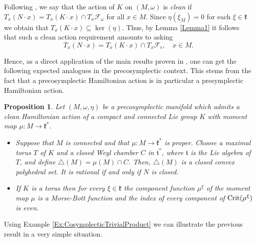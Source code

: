 \documentclass[
  a4paper, 
  reqno, 
  oneside, 
  12pt
]{amsart}
\newtheorem{proposition}[theorem]{Proposition}
\theoremstyle{definition}
\theoremstyle{remark}
\begin{document}
Following \cite{LinSjamaar}, we say that the action of $K$ on $(M,\omega)$ is \emph{clean} if $T_x(N\cdot x)=T_x(K\cdot x)\cap T_x \mathcal{F}_\omega$ for all $x\in M$. Since $\eta(\xi_M)=0$ for each $\xi\in \mathfrak{k}$ we obtain that $T_x(K\cdot x)\subseteq \ker(\eta)$. Thus, by Lemma \ref{Lemma1} it follows that such a clean action requirement amounts to asking
$$T_x(N\cdot x)=T_x(K\cdot x)\cap T_x \mathcal{F}_\flat,\quad x\in M.$$
 



Hence, as a direct application of the main results proven in \cite{LinSjamaar}, one can get the following expected analogues in the precosymplectic context. This stems from the fact that a precosymplectic Hamiltonian action is in particular a presymplectic Hamiltonian action.

\begin{proposition}\label{prop:MomentBodyMorseBott}
Let $(M,\omega,\eta)$ be a precosymplectic manifold which admits a clean Hamiltonian action of a compact and connected Lie group $K$ with moment map $\mu: M\to \mathfrak{k}^\ast$.
\begin{itemize}
\item Suppose that $M$ is connected and that $\mu:M\to \mathfrak{k}^\ast$ is proper. Choose a maximal torus $T$ of $K$ and a closed Weyl chamber $C$ in $\mathfrak{t}^\ast$, where $\mathfrak{t}$ is the Lie algebra of $T$, and define $\triangle(M) =\mu(M)\cap C$. Then, $\triangle(M)$ is a closed convex polyhedral set. It is rational if and only if $N$ is closed.
\item If $K$ is a torus then for every $\xi\in\mathfrak{k}$ the component function $\mu^\xi$ of the moment map $\mu$ is a Morse-Bott function and the index of every component of $\textnormal{Crit}(\mu^\xi)$ is even.
\end{itemize}
\end{proposition}

Using Example \ref{Ex:CosymplecticTrivialProduct} we can illustrate the previous result in a very simple situation.
\end{document}
